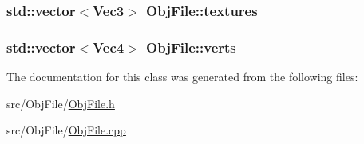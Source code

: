 \subsubsection[{\texorpdfstring{textures}{textures}}]{\setlength{\rightskip}{0pt plus 5cm}std\+::vector$<${\bf Vec3}$>$ Obj\+File\+::textures}\hypertarget{class_obj_file_aabfa30bb889d6e2bf08d54215c16d140}{}\label{class_obj_file_aabfa30bb889d6e2bf08d54215c16d140}
\subsubsection[{\texorpdfstring{verts}{verts}}]{\setlength{\rightskip}{0pt plus 5cm}std\+::vector$<${\bf Vec4}$>$ Obj\+File\+::verts}\hypertarget{class_obj_file_aac40796c7e8d9ee0d2af0311c0eca836}{}\label{class_obj_file_aac40796c7e8d9ee0d2af0311c0eca836}


The documentation for this class was generated from the following files\+:\begin{DoxyCompactItemize}
\item 
src/\+Obj\+File/\hyperlink{_obj_file_8h}{Obj\+File.\+h}\item 
src/\+Obj\+File/\hyperlink{_obj_file_8cpp}{Obj\+File.\+cpp}\end{DoxyCompactItemize}
